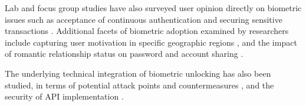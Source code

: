 Lab and focus group studies have also surveyed user opinion directly on biometric issues such as acceptance of continuous authentication %
\cite{crawford2014understanding} and securing sensitive transactions %
\cite{karatzouni2007perceptions}. Additional facets of biometric adoption examined by researchers include capturing user motivation in specific geographic regions \cite{rashed2015towards}, and the impact of romantic relationship status on password and account sharing \cite{park2018share}.

The underlying technical integration of biometric unlocking has also been studied, in terms of potential attack points and countermeasures \cite{meng2015surveying}, and the security of API implementation \cite{bianchi2018broken}.

